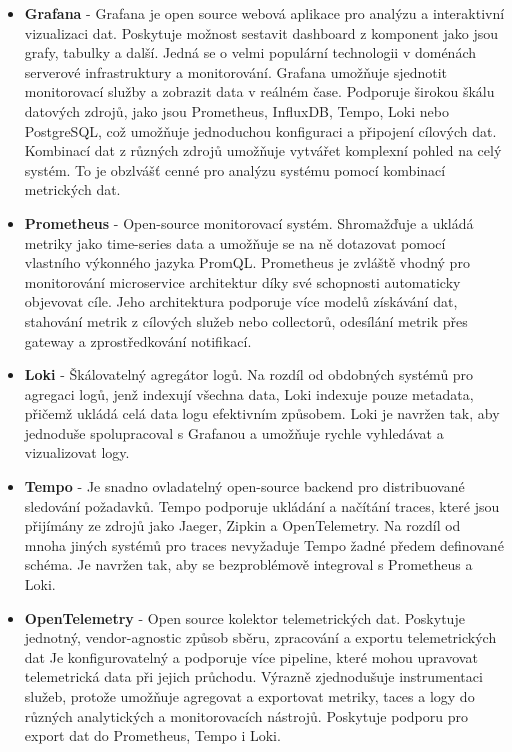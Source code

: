 \begin{itemize}
  \item \textbf{Grafana} - Grafana je open source webová aplikace pro analýzu a interaktivní vizualizaci dat. Poskytuje možnost sestavit dashboard z komponent jako jsou grafy, tabulky a další. Jedná se o velmi populární technologii v doménách serverové infrastruktury a monitorování. Grafana umožňuje sjednotit monitorovací služby a zobrazit data v reálném čase. Podporuje širokou škálu datových zdrojů, jako jsou Prometheus, InfluxDB, Tempo, Loki nebo PostgreSQL, což umožňuje jednoduchou konfiguraci a připojení cílových dat. Kombinací dat z různých zdrojů umožňuje vytvářet komplexní pohled na celý systém. To je obzlvášť cenné pro analýzu systému pomocí kombinací metrických dat.
  \item \textbf{Prometheus} - Open-source monitorovací systém. Shromažďuje a ukládá metriky jako time-series data a umožňuje se na ně dotazovat pomocí vlastního výkonného jazyka PromQL. Prometheus je zvláště vhodný pro monitorování microservice architektur díky své schopnosti automaticky objevovat cíle. Jeho architektura podporuje více modelů získávání dat, stahování metrik z cílových služeb nebo collectorů, odesílání metrik přes gateway a zprostředkování notifikací.
  \item \textbf{Loki} - Škálovatelný agregátor logů. Na rozdíl od obdobných systémů pro agregaci logů, jenž indexují všechna data, Loki indexuje pouze metadata, přičemž ukládá celá data logu efektivním způsobem. Loki je navržen tak, aby jednoduše spolupracoval s Grafanou a umožňuje rychle vyhledávat a vizualizovat logy.
  \item \textbf{Tempo} - Je snadno ovladatelný open-source backend pro distribuované sledování požadavků. Tempo podporuje ukládání a načítání traces, které jsou přijímány ze zdrojů jako Jaeger, Zipkin a OpenTelemetry. Na rozdíl od mnoha jiných systémů pro traces nevyžaduje Tempo žadné předem definované schéma. Je navržen tak, aby se bezproblémově integroval s Prometheus a Loki.
  \item \textbf{OpenTelemetry} - Open source kolektor telemetrických dat. Poskytuje jednotný, vendor-agnostic způsob sběru, zpracování a exportu telemetrických dat  Je konfigurovatelný a podporuje více pipeline, které mohou upravovat telemetrická data při jejich průchodu. Výrazně zjednodušuje instrumentaci služeb, protože umožňuje agregovat a exportovat metriky, taces a logy do různých analytických a monitorovacích nástrojů. Poskytuje podporu pro export dat do Prometheus, Tempo i Loki.
\end{itemize}

